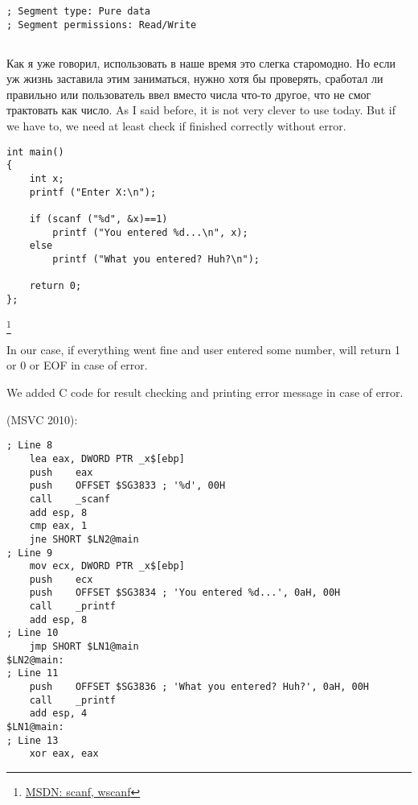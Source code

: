 \begin{lstlisting}
; Segment type: Pure data
; Segment permissions: Read/Write
\end{lstlisting}

\subsection{}

\IFRU
{Как я уже говорил, использовать \scanf в наше время это слегка старомодно. 
Но если уж жизнь заставила этим заниматься, нужно хотя бы проверять, сработал ли \scanf 
правильно или пользователь ввел вместо числа что-то другое, что \scanf не смог трактовать как число.}
{As I said before, it is not very clever to use \scanf today. 
But if we have to, we need at least check if \scanf finished correctly without error.}

\begin{lstlisting}
int main() 
{
	int x;
	printf ("Enter X:\n");

	if (scanf ("%d", &x)==1)
		printf ("You entered %d...\n", x);
	else
		printf ("What you entered? Huh?\n");

	return 0;
};
\end{lstlisting}

 \scanf\footnote{\href{http://msdn.microsoft.com/en-us/library/9y6s16x1(VS.71).aspx}{MSDN: scanf, wscanf}} 

{In our case, if everything went fine and user entered some number, 
\scanf will return 1 or 0 or EOF in case of error.}

{We added C code for \scanf result checking and printing error message in case of error.}

 (MSVC 2010):

\begin{lstlisting}
; Line 8
	lea	eax, DWORD PTR _x$[ebp]
	push	eax
	push	OFFSET $SG3833 ; '%d', 00H
	call	_scanf
	add	esp, 8
	cmp	eax, 1
	jne	SHORT $LN2@main
; Line 9
	mov	ecx, DWORD PTR _x$[ebp]
	push	ecx
	push	OFFSET $SG3834 ; 'You entered %d...', 0aH, 00H
	call	_printf
	add	esp, 8
; Line 10
	jmp	SHORT $LN1@main
$LN2@main:
; Line 11
	push	OFFSET $SG3836 ; 'What you entered? Huh?', 0aH, 00H
	call	_printf
	add	esp, 4
$LN1@main:
; Line 13
	xor	eax, eax
\end{lstlisting}

